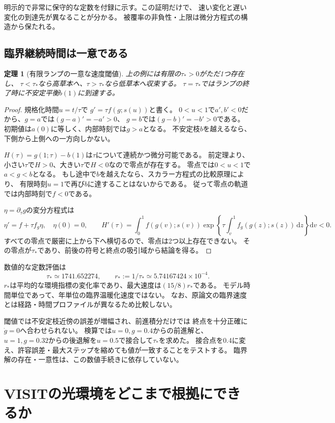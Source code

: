 \documentclass[a4paper,11pt]{ltjsarticle}
\newtheorem{theorem}[proposition]{定理}
\newcommand{\dd}{\mathrm d}
\begin{document}
明示的で非常に保守的な定数を付録に示す。この証明だけで、
速い変化と遅い変化の到達先が異なることが分かる。
被覆率の非負性・上限は微分方程式の構造から保たれる。

\subsection{臨界継続時間は一意である}
\begin{theorem}[有限ランプの一意な速度閾値]
上の例には有限の$\tau_*>0$がただ1つ存在し、
$\tau<\tau_*$なら高草本へ、$\tau>\tau_*$なら低草本へ収束する。
$\tau=\tau_*$ではランプの終了時に不安定平衡$b(1)$に到達する。
\end{theorem}
\begin{proof}
規格化時間$u=t/\tau$で
$g'=\tau f(g;s(u))$と書く。
$0<u<1$で$a',b'<0$だから、$g=a$では$(g-a)'=-a'>0$、
$g=b$では$(g-b)'=-b'>0$である。
初期値は$a(0)$に等しく、内部時刻では$g>a$となる。
不安定枝$b$を越えるなら、下側から上側への一方向しかない。

$H(\tau)=g(1;\tau)-b(1)$は$\tau$について連続かつ微分可能である。
前定理より、小さい$\tau$で$H>0$、大きい$\tau$で$H<0$なので零点が存在する。
零点では$0<u<1$で$a<g<b$となる。
もし途中で$b$を越えたなら、スカラー方程式の比較原理により、
有限時刻$u=1$で再び$b$に達することはないからである。
従って零点の軌道では内部時刻で$f<0$である。

$\eta=\partial_\tau g$の変分方程式は
\[
 \eta'=f+\tau f_g\eta,\quad \eta(0)=0,\qquad
 H'(\tau)=\int_0^1 f(g(v);s(v))
       \exp\left\{\tau\int_v^1 f_g(g(z);s(z))\,\dd z\right\}\dd v<0.
\]
すべての零点で厳密に上から下へ横切るので、零点は2つ以上存在できない。
その零点が$\tau_*$であり、前後の符号と終点の吸引域から結論を得る。
\end{proof}

数値的な定数評価は
\[
 \tau_*\simeq1741.652274,\qquad
 r_*:=1/\tau_*\simeq5.74167424\times10^{-4}.
\]
$r_*$は平均的な環境指標の変化率であり、最大速度は$(15/8)r_*$である。
モデル時間単位であって、年単位の臨界温暖化速度ではない。
なお、原論文の臨界速度とは経路・時間プロファイルが異なるため比較しない。

閾値では不安定枝近傍の誤差が増幅され、前進積分だけでは
終点を十分正確に$\dot g=0$へ合わせられない。
検算では$u=0,g=0.4$からの前進解と、
$u=1,g=0.32$からの後退解を$u=0.5$で接合して$\tau_*$を求めた。
接合点を0.4に変え、許容誤差・最大ステップを縮めても値が一致することをテストする。
臨界解の存在・一意性は、この数値手続きに依存していない。

\section{VISITの光環境をどこまで根拠にできるか}
\end{document}
